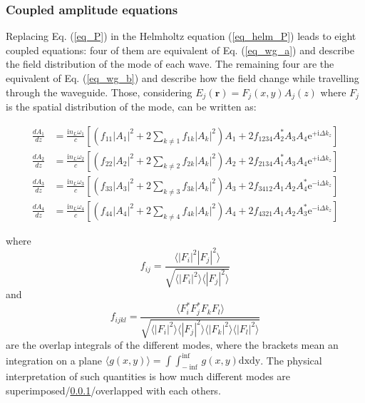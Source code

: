 \documentclass[12pt,a4paper,twoside]{article}
\begin{document}
\subsubsection{Coupled amplitude equations}

Replacing Eq. (\ref{eq_P}) in the Helmholtz equation (\ref{eq_helm_P}) leads to eight coupled equations: four of them are equivalent of Eq. (\ref{eq_wg_a}) and describe the field distribution of the mode of each wave.
The remaining four are the equivalent of Eq. (\ref{eq_wg_b}) and describe how the field change while travelling through the waveguide.
Those, considering $E_j(\textbf{r}) = F_j(x,y)A_j(z)$ where $F_j$ is the spatial distribution of the mode, can be written as:

\begin{subequations}
\begin{align}
	\frac{dA_1}{dz} &= \frac{\mathrm{i}n_L\omega_1}{c}\left[ \left( f_{11} |A_1|^2 + 2 \sum_{k\neq1} f_{1k}|A_k|^2\right)A_1 + 2f_{1234}A_2^*A_3A_4\mathrm{e}^{+\mathrm{i}\Delta k_z} \right]
		\label{eq_coupled_amplitude_a}\\
	\frac{dA_2}{dz} &= \frac{\mathrm{i}n_L\omega_2}{c}\left[ \left( f_{22} |A_2|^2 + 2 \sum_{k\neq2} f_{2k}|A_k|^2\right)A_2 + 2f_{2134}A_1^*A_3A_4\mathrm{e}^{+\mathrm{i}\Delta k_z} \right]
		\label{eq_coupled_amplitude_b}\\
	\frac{dA_3}{dz} &= \frac{\mathrm{i}n_L\omega_3}{c}\left[ \left( f_{33} |A_3|^2 + 2 \sum_{k\neq3} f_{3k}|A_k|^2\right)A_3 + 2f_{3412}A_1A_2A_4^*\mathrm{e}^{-\mathrm{i}\Delta k_z} \right]
		\label{eq_coupled_amplitude_c}\\
	\frac{dA_4}{dz} &= \frac{\mathrm{i}n_L\omega_4}{c}\left[ \left( f_{44} |A_4|^2 + 2 \sum_{k\neq4} f_{4k}|A_k|^2\right)A_4 + 2f_{4321}A_1A_2A_3^*\mathrm{e}^{-\mathrm{i}\Delta k_z} \right]
		\label{eq_coupled_amplitude_d}
\end{align}
\end{subequations}

where
\begin{equation}
	f_{ij} = \frac{\langle |F_i|^2 |F_j|^2 \rangle}{\sqrt{\langle |F_i|^2 \rangle\langle |F_j|^2 \rangle}}
\end{equation}
\hspace{18pt}and
\begin{equation}
	f_{ijkl} = \frac{\langle F_i^* F_j^* F_k F_l \rangle}{\sqrt{\langle |F_i|^2 \rangle\langle |F_j|^2 \rangle\langle |F_k|^2 \rangle\langle |F_l|^2 \rangle}}
\end{equation}
\hspace{18pt}are the overlap integrals of the different modes, where the brackets mean an integration on a plane $\langle g(x,y)\rangle = \int\int_{-\inf}^{\inf}g(x,y)\mathrm{dxdy}$.
The physical interpretation of such quantities is how much different modes are superimposed/\ref{}/overlapped with each others.
\end{document}
